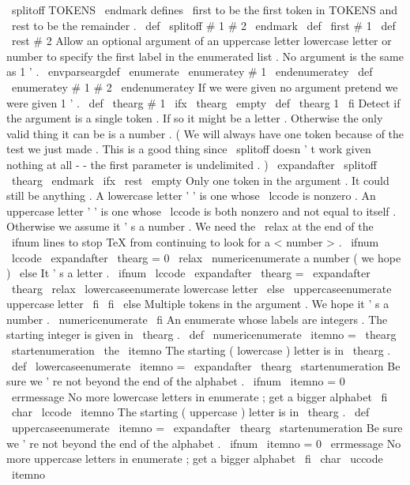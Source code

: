 %
\
splitoff
TOKENS
\
endmark
defines
\
first
to
be
the
first
token
in
%
TOKENS
and
\
rest
to
be
the
remainder
.
%
\
def
\
splitoff
#
1
#
2
\
endmark
{
\
def
\
first
{
#
1
}
\
def
\
rest
{
#
2
}
}
%
%
Allow
an
optional
argument
of
an
uppercase
letter
lowercase
letter
%
or
number
to
specify
the
first
label
in
the
enumerated
list
.
No
%
argument
is
the
same
as
1
'
.
%
\
envparseargdef
\
enumerate
{
\
enumeratey
#
1
\
endenumeratey
}
\
def
\
enumeratey
#
1
#
2
\
endenumeratey
{
%
%
If
we
were
given
no
argument
pretend
we
were
given
1
'
.
\
def
\
thearg
{
#
1
}
%
\
ifx
\
thearg
\
empty
\
def
\
thearg
{
1
}
\
fi
%
%
Detect
if
the
argument
is
a
single
token
.
If
so
it
might
be
a
%
letter
.
Otherwise
the
only
valid
thing
it
can
be
is
a
number
.
%
(
We
will
always
have
one
token
because
of
the
test
we
just
made
.
%
This
is
a
good
thing
since
\
splitoff
doesn
'
t
work
given
nothing
at
%
all
-
-
the
first
parameter
is
undelimited
.
)
\
expandafter
\
splitoff
\
thearg
\
endmark
\
ifx
\
rest
\
empty
%
Only
one
token
in
the
argument
.
It
could
still
be
anything
.
%
A
lowercase
letter
'
'
is
one
whose
\
lccode
is
nonzero
.
%
An
uppercase
letter
'
'
is
one
whose
\
lccode
is
both
nonzero
and
%
not
equal
to
itself
.
%
Otherwise
we
assume
it
'
s
a
number
.
%
%
We
need
the
\
relax
at
the
end
of
the
\
ifnum
lines
to
stop
TeX
from
%
continuing
to
look
for
a
<
number
>
.
%
\
ifnum
\
lccode
\
expandafter
\
thearg
=
0
\
relax
\
numericenumerate
%
a
number
(
we
hope
)
\
else
%
It
'
s
a
letter
.
\
ifnum
\
lccode
\
expandafter
\
thearg
=
\
expandafter
\
thearg
\
relax
\
lowercaseenumerate
%
lowercase
letter
\
else
\
uppercaseenumerate
%
uppercase
letter
\
fi
\
fi
\
else
%
Multiple
tokens
in
the
argument
.
We
hope
it
'
s
a
number
.
\
numericenumerate
\
fi
}
%
An
enumerate
whose
labels
are
integers
.
The
starting
integer
is
%
given
in
\
thearg
.
%
\
def
\
numericenumerate
{
%
\
itemno
=
\
thearg
\
startenumeration
{
\
the
\
itemno
}
%
}
%
The
starting
(
lowercase
)
letter
is
in
\
thearg
.
\
def
\
lowercaseenumerate
{
%
\
itemno
=
\
expandafter
\
thearg
\
startenumeration
{
%
%
Be
sure
we
'
re
not
beyond
the
end
of
the
alphabet
.
\
ifnum
\
itemno
=
0
\
errmessage
{
No
more
lowercase
letters
in
enumerate
;
get
a
bigger
alphabet
}
%
\
fi
\
char
\
lccode
\
itemno
}
%
}
%
The
starting
(
uppercase
)
letter
is
in
\
thearg
.
\
def
\
uppercaseenumerate
{
%
\
itemno
=
\
expandafter
\
thearg
\
startenumeration
{
%
%
Be
sure
we
'
re
not
beyond
the
end
of
the
alphabet
.
\
ifnum
\
itemno
=
0
\
errmessage
{
No
more
uppercase
letters
in
enumerate
;
get
a
bigger
alphabet
}
\
fi
\
char
\
uccode
\
itemno
}
%
}
